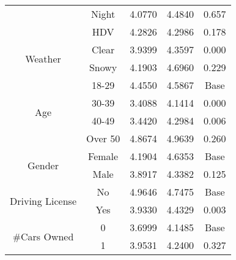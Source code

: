 \begin{small}
\begin{longtable}{|ccccc|}
                                          & Night           & 4.0770                       & 4.4840                       & 0.657            \\ 
                                          & HDV             & 4.2826                       & 4.2986                       & 0.178            \\ \hline
\multirow{2}{*}{Weather}                  & Clear           & 3.9399                       & 4.3597                       & 0.000            \\ 
                                          & Snowy           & 4.1903                       & 4.6960                       & 0.229            \\ \hline
\multirow{4}{*}{Age}                      & 18-29           & 4.4550                       & 4.5867                       & Base             \\ 
                                          & 30-39           & 3.4088                       & 4.1414                       & 0.000            \\ 
                                          & 40-49           & 3.4420                       & 4.2984                       & 0.006            \\ 
                                          & Over 50         & 4.8674                       & 4.9639                       & 0.260            \\ \hline
\multirow{2}{*}{Gender}                   & Female          & 4.1904                       & 4.6353                       & Base             \\ 
                                          & Male            & 3.8917                       & 4.3382                       & 0.125            \\ \hline
\multirow{2}{*}{Driving License}          & No              & 4.9646                       & 4.7475                       & Base             \\ 
                                          & Yes             & 3.9330                       & 4.4329                       & 0.003            \\ \hline
\multirow{3}{*}{\#Cars Owned}             & 0               & 3.6999                       & 4.1485                       & Base             \\ 
                                          & 1               & 3.9531                       & 4.2400                       & 0.327            \\ 

\end{longtable}
\end{small}
